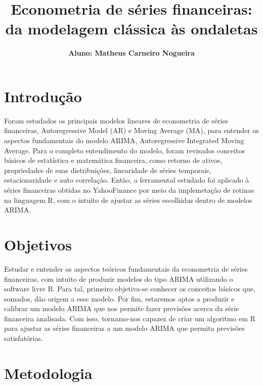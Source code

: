 \documentclass[12pt]{article}
\title{\textbf{Econometria de séries financeiras: da modelagem clássica às ondaletas}}
\author{\textbf{Aluno: Matheus Carneiro Nogueira}}
\date{}
\begin{document}
\maketitle

\section{Introdução}\label{sec_intro}
Foram estudados os principais modelos lineares de econometria de séries financeiras,
Autoregressive Model (AR) e Moving Average (MA), para entender os aspectos
fundamentais do modelo ARIMA, Autoregressive Integrated Moving Average. Para o
completo entendimento do modelo, foram revisados conceitos básicos de estatística e
matemática financeira, como retorno de ativos, propriedades de suas distribuições, linearidade
de séries temporais, estacionaridade e auto correlação. Então, o ferramental estudado foi aplicado à séries financeiras obtidas no YahooFinance por meio da implemetação de rotinas na linguagem R, com o intuito de ajustar as séries escolhidas dentro de modelos ARIMA. 

\section{Objetivos}\label{sec_obje}
Estudar e entender os aspectos teóricos fundamentais da econometria de séries
financeiras, com intuito de produzir modelos do tipo ARIMA utilizando o software livre R. Para tal, primeiro objetiva-se conhecer os conceitos básicos que, somados, dão origem a esse modelo. Por fim, estaremos
aptos a produzir e calibrar um modelo ARIMA que nos permite fazer previsões acerca da
série financeira analisada. Com isso, tornamo-nos capazez de criar um algoritmo em R para ajustar as séries financeiras a um modelo ARIMA que permita previsões satisfatórias. 


\section{Metodologia}
\end{document}
